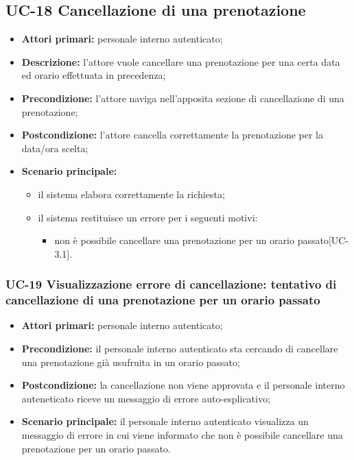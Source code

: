 \subsection{UC-18 Cancellazione di una prenotazione}

\begin{itemize}
\item \textbf{Attori primari:} personale interno autenticato;
\item \textbf{Descrizione:} l'attore vuole cancellare una prenotazione per una certa data ed orario effettuata in precedenza;
\item \textbf{Precondizione:} l'attore naviga nell’apposita sezione di cancellazione di una prenotazione;
\item \textbf{Postcondizione:} l'attore cancella correttamente la prenotazione per la data/ora scelta;
\item \textbf{Scenario principale:} 
	\begin{itemize}
		\item il sistema elabora correttamente la richiesta;
		\item il sistema restituisce un errore per i seguenti motivi:
		\begin{itemize}
			\item non è possibile cancellare una prenotazione per un orario passato[UC-3.1].
		\end{itemize}
	\end{itemize}
\end{itemize}

\subsubsection{UC-19 Visualizzazione errore di cancellazione: tentativo di cancellazione di una prenotazione per un orario passato}
\begin{itemize}
\item \textbf{Attori primari:} personale interno autenticato;
\item \textbf{Precondizione:} il personale interno autenticato sta cercando di cancellare una prenotazione già usufruita in un orario passato;
\item \textbf{Postcondizione:} la cancellazione non viene approvata e il personale interno auteneticato riceve un messaggio di errore auto-esplicativo;
\item \textbf{Scenario principale:} il personale interno autenticato visualizza un messaggio di errore in cui viene informato che non è possibile cancellare una prenotazione per un orario passato.
\end{itemize}
\newpage

